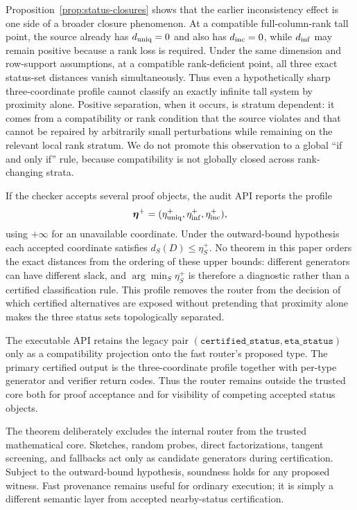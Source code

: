 \documentclass[11pt]{article}
\theoremstyle{definition}
\begin{document}
Proposition~\ref{prop:status-closures} shows that the earlier inconsistency effect is one side of a broader closure phenomenon. At a compatible full-column-rank tall point, the source already has $d_{\rm uniq}=0$ and also has $d_{\rm inc}=0$, while $d_{\rm inf}$ may remain positive because a rank loss is required. Under the same dimension and row-support assumptions, at a compatible rank-deficient point, all three exact status-set distances vanish simultaneously. Thus even a hypothetically sharp three-coordinate profile cannot classify an exactly infinite tall system by proximity alone. Positive separation, when it occurs, is stratum dependent: it comes from a compatibility or rank condition that the source violates and that cannot be repaired by arbitrarily small perturbations while remaining on the relevant local rank stratum. We do not promote this observation to a global ``if and only if'' rule, because compatibility is not globally closed across rank-changing strata.

If the checker accepts several proof objects, the audit API reports the profile
\[
\boldsymbol\eta^+=(\eta_{\rm uniq}^+,\eta_{\rm inf}^+,\eta_{\rm inc}^+),
\]
using $+\infty$ for an unavailable coordinate. Under the outward-bound hypothesis each accepted coordinate satisfies $d_S(D)\le\eta_S^+$. No theorem in this paper orders the exact distances from the ordering of these upper bounds: different generators can have different slack, and $\arg\min_S\eta_S^+$ is therefore a diagnostic rather than a certified classification rule. This profile removes the router from the decision of which certified alternatives are exposed without pretending that proximity alone makes the three status sets topologically separated.

The executable API retains the legacy pair $(\texttt{certified\_status},\texttt{eta\_status})$ only as a compatibility projection onto the fast router's proposed type. The primary certified output is the three-coordinate profile together with per-type generator and verifier return codes. Thus the router remains outside the trusted core both for proof acceptance and for visibility of competing accepted status objects.

The theorem deliberately excludes the internal router from the trusted mathematical core. Sketches, random probes, direct factorizations, tangent screening, and fallbacks act only as candidate generators during certification. Subject to the outward-bound hypothesis, soundness holds for any proposed witness. Fast provenance remains useful for ordinary execution; it is simply a different semantic layer from accepted nearby-status certification.
\end{document}

